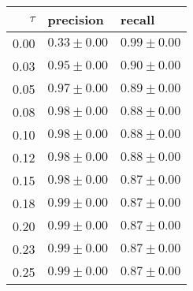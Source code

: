 \begin{table}
\centering
\label{tab:dynamic}
\begin{tabular}{|r|l|l|}
\toprule
$\tau$ &        precision &           recall \\
\midrule
  0.00 &  $0.33 \pm 0.00$ &  $0.99 \pm 0.00$ \\
  0.03 &  $0.95 \pm 0.00$ &  $0.90 \pm 0.00$ \\
  0.05 &  $0.97 \pm 0.00$ &  $0.89 \pm 0.00$ \\
  0.08 &  $0.98 \pm 0.00$ &  $0.88 \pm 0.00$ \\
  0.10 &  $0.98 \pm 0.00$ &  $0.88 \pm 0.00$ \\
  0.12 &  $0.98 \pm 0.00$ &  $0.88 \pm 0.00$ \\
  0.15 &  $0.98 \pm 0.00$ &  $0.87 \pm 0.00$ \\
  0.18 &  $0.99 \pm 0.00$ &  $0.87 \pm 0.00$ \\
  0.20 &  $0.99 \pm 0.00$ &  $0.87 \pm 0.00$ \\
  0.23 &  $0.99 \pm 0.00$ &  $0.87 \pm 0.00$ \\
  0.25 &  $0.99 \pm 0.00$ &  $0.87 \pm 0.00$ \\
\bottomrule
\end{tabular}
\end{table}
